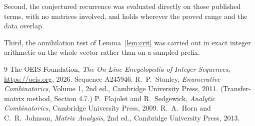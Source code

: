 \documentclass[11pt,a4paper]{article}
\theoremstyle{plain}
\theoremstyle{definition}
\begin{document}
Second, the conjectured recurrence was evaluated directly on those published terms, with no
matrices involved, and holds wherever the proved range and the data overlap.

Third, the annihilation test of Lemma~\ref{lem:crit} was carried out in exact integer
arithmetic on the whole vector rather than on a sampled prefix.

\begin{thebibliography}{9}
 The OEIS Foundation, \emph{The On-Line Encyclopedia of Integer
Sequences}, \url{https://oeis.org}, 2026. Sequence A245946.
 R.~P.~Stanley, \emph{Enumerative Combinatorics}, Volume 1, 2nd ed.,
Cambridge University Press, 2011. (Transfer-matrix method, Section 4.7.)
 P.~Flajolet and R.~Sedgewick, \emph{Analytic Combinatorics}, Cambridge
University Press, 2009.
 R.~A.~Horn and C.~R.~Johnson, \emph{Matrix Analysis}, 2nd ed., Cambridge
University Press, 2013.
\end{thebibliography}
\end{document}
